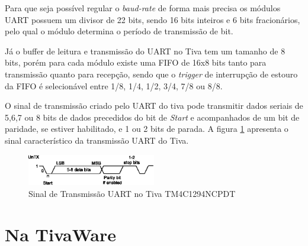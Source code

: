 Para que seja possível regular o \emph{baud-rate} de forma mais precisa os módulos UART possuem um divisor de 22 bits, sendo 16 bits inteiros e 6 bits fracionários, pelo qual o módulo determina o período de transmissão de bit.

Já o buffer de leitura e transmissão do UART no Tiva tem um tamanho de 8 bits, porém para cada módulo existe uma FIFO de 16x8 bits tanto para transmissão quanto para recepção, sendo que o \emph{trigger} de interrupção de estouro da FIFO é selecionável entre 1/8, 1/4, 1/2, 3/4, 7/8 ou 8/8. 

O sinal de transmissão criado pelo UART do tiva pode transmitir dados seriais de 5,6,7 ou 8 bits de dados precedidos do bit de \emph{Start} e acompanhados de um bit de paridade, se estiver habilitado, e 1 ou 2 bits de parada. A figura \ref{fig:uartTiva} apresenta o sinal característico da transmissão UART do Tiva. 

\begin{figure}[H]
	\centering
	\includegraphics[width=0.5\textwidth] {figuras/uartTiva.eps}
	\caption{Sinal de Transmissão UART no Tiva TM4C1294NCPDT}
	\label{fig:uartTiva}
\end{figure}


\section{Na TivaWare}

